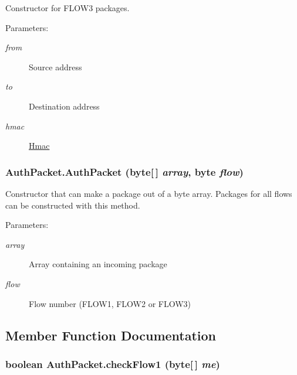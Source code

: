 Constructor for FLOW3 packages. \begin{Desc}
\item[Parameters:]
\begin{description}
\item[{\em from}]Source address \item[{\em to}]Destination address \item[{\em hmac}]\hyperlink{class_hmac}{Hmac} \end{description}
\end{Desc}
\hypertarget{class_auth_packet_c2}{
\subsubsection[AuthPacket]{\setlength{\rightskip}{0pt plus 5cm}Auth\-Packet.Auth\-Packet (byte\mbox{[}$\,$\mbox{]} {\em array}, byte {\em flow})}}
\label{class_auth_packet_c2}


Constructor that can make a package out of a byte array. Packages for all flows can be constructed with this method. \begin{Desc}
\item[Parameters:]
\begin{description}
\item[{\em array}]Array containing an incoming package \item[{\em flow}]Flow number (FLOW1, FLOW2 or FLOW3) \end{description}
\end{Desc}


\subsection{Member Function Documentation}
\hypertarget{class_auth_packet_c8}{
\subsubsection[checkFlow1]{\setlength{\rightskip}{0pt plus 5cm}boolean Auth\-Packet.check\-Flow1 (byte\mbox{[}$\,$\mbox{]} {\em me})}}
\label{class_auth_packet_c8}


